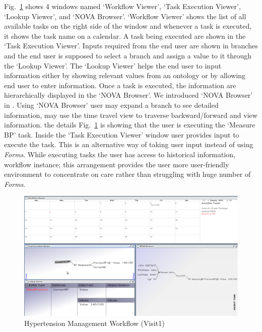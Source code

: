\documentclass[a4paper]{llncs}
\begin{document}
Fig.~\ref{fig:visit310} shows 4 windows named `Workflow Viewer', `Task Execution Viewer', `Lookup Viewer', and `NOVA Browser'. 
`Workflow Viewer' shows the list of all available tasks on the right side of the window and whenever a task is executed, it shows the task name on a calendar. 
A task being executed are shown in the `Task Execution Viewer'. Inputs required from the end user are shown in branches and the end user is supposed to select a branch and assign a value to it 
through the `Lookup Viewer'. The `Lookup Viewer' helps the end user to input information either by showing relevant values from an ontology or by allowing end user to enter information. 
Once a task is executed, the information are hierarchically displayed in the `NOVA Browser'. %
We introduced `NOVA Browser' in \cite{MacCaullRabbi2011}. Using `NOVA Browser' user may expand a branch to see detailed information, may use the time travel view to traverse backward/forward and 
view information. the details
Fig.~\ref{fig:visit310} is showing that the user is executing the `Measure BP' task. 
Inside the `Task Execution Viewer' window user provides input to execute the task. 
This is an alternative way of taking user input instead of using \textit{Forms}. 
While executing tasks the user has access to historical information, workflow instance; this arrangement provides the user more user-friendly environment to concentrate on care rather than struggling with huge number of \textit{Forms}.


\begin{figure}
  \begin{center}
    \includegraphics[width=\textwidth]{visit1_new.png}
    \caption{Hypertension Management Workflow (Visit1)}
    \label{fig:visit310}
  \end{center}
\end{figure}
\end{document}
